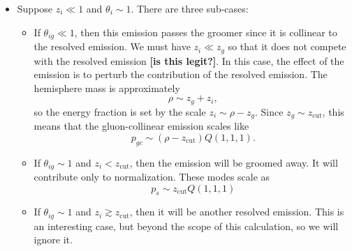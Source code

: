 \documentclass[11pt,twoside,reqno]{amsart}
\theoremstyle{plain}
\theoremstyle{remark}
\theoremstyle{definition}
\theoremstyle{remark}
\theoremstyle{definition}
\theoremstyle{definition}
\newcommand{\zcut}{z_\mathrm{cut}}
\begin{document}
	\begin{itemize}
		\item Suppose $z_i \ll 1$ and $\theta_i \sim 1$. There are three sub-cases:
		\begin{itemize}
			\item If $\theta_{ig} \ll 1$, then this emission passes the groomer since it is collinear to the resolved emission. We must have $z_i \ll z_g$ so that it does not compete with the resolved emission {\color{red}\textbf{[is this legit?]}}. In this case, the effect of the emission is to perturb the contribution of the resolved emission. The hemisphere mass is approximately
			\begin{equation}
				\rho \sim z_g + z_i,
			\end{equation}
			so the energy fraction is set by the scale $z_i \sim \rho - z_g$. Since $z_g \sim \zcut$, this means that the gluon-collinear emission scales like
			\begin{equation}
				p_{gc} \sim (\rho - \zcut) Q(1, 1, 1).
			\end{equation}

			\item If $\theta_{ig} \sim 1$ and $z_i < \zcut$, then the emission will be groomed away. It will contribute only to normalization. These modes scale as
			\begin{equation}
				p_{s} \sim \zcut Q (1, 1, 1)
			\end{equation}

			\item If $\theta_{ig} \sim 1$ and $z_i \gtrsim \zcut$, then it will be another resolved emission. This is an interesting case, but beyond the scope of this calculation, so we will ignore it.
		\end{itemize}


\end{itemize}
\end{document}
